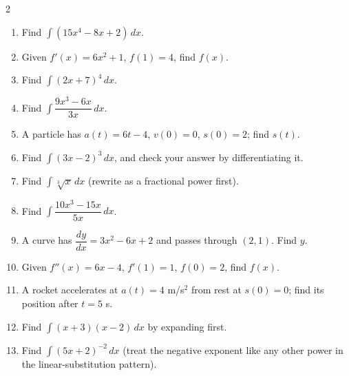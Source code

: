 \documentclass[11pt]{article}
\begin{document}
\begin{recapbox}
\begin{multicols}{2}
\small
\begin{enumerate}[leftmargin=*,itemsep=3pt]
  \item Find $\displaystyle\int(15x^4-8x+2)\,dx$.
  \item Given $f'(x)=6x^2+1$, $f(1)=4$, find $f(x)$.
  \item Find $\displaystyle\int(2x+7)^4\,dx$.
  \item Find $\displaystyle\int\dfrac{9x^3-6x}{3x}\,dx$.
  \item A particle has $a(t)=6t-4$, $v(0)=0$, $s(0)=2$; find $s(t)$.
  \item Find $\displaystyle\int(3x-2)^3\,dx$, and check your answer by differentiating it.
  \item Find $\displaystyle\int\sqrt[3]{x}\,dx$ (rewrite as a fractional power first).
  \item Find $\displaystyle\int\dfrac{10x^3-15x}{5x}\,dx$.
  \item A curve has $\dfrac{dy}{dx}=3x^2-6x+2$ and passes through $(2,1)$. Find $y$.
  \item Given $f''(x)=6x-4$, $f'(1)=1$, $f(0)=2$, find $f(x)$.
  \item A rocket accelerates at $a(t)=4$ m/s$^2$ from rest at $s(0)=0$; find its position after $t=5$ s.
  \item Find $\displaystyle\int(x+3)(x-2)\,dx$ by expanding first.
  \item Find $\displaystyle\int(5x+2)^{-2}\,dx$ (treat the negative exponent like any other power in the linear-substitution pattern).
\end{enumerate}
\end{multicols}
\end{recapbox}
\end{document}
